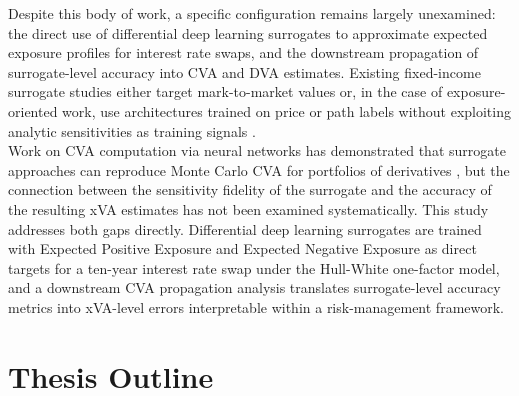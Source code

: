  \noindent
  Despite this body of work, a specific configuration remains largely unexamined: the direct use of differential deep learning surrogates to approximate expected exposure profiles for
  interest rate swaps, and the downstream propagation of surrogate-level accuracy into CVA and DVA estimates. Existing fixed-income surrogate studies either target mark-to-market values or,
  in the case of exposure-oriented work, use architectures trained on price or path labels without exploiting analytic sensitivities as training signals \cite{vanhala2023dataxva,
  dhandapani2024optimizing}. \\

  \noindent
  Work on CVA computation via neural networks has demonstrated that surrogate approaches can reproduce Monte Carlo CVA for portfolios of derivatives
  \cite{andersson2021deeplearning}, but the connection between the sensitivity fidelity of the surrogate and the accuracy of the resulting xVA estimates has not been examined systematically.
  This study addresses both gaps directly. Differential deep learning surrogates are trained with Expected Positive Exposure and Expected Negative Exposure as direct targets for a ten-year
  interest rate swap under the Hull-White one-factor model, and a downstream CVA propagation analysis translates surrogate-level accuracy metrics into xVA-level errors interpretable within a
  risk-management framework.

\chapter{Thesis Outline}
